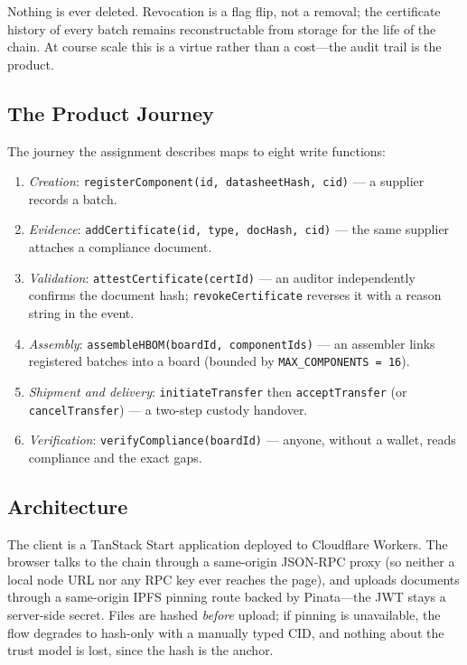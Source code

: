 \documentclass[conference]{IEEEtran}
\begin{document}
Nothing is ever deleted. Revocation is a flag flip, not a removal; the certificate history of every batch remains reconstructable from storage for the life of the chain. At course scale this is a virtue rather than a cost---the audit trail is the product.

\subsection{The Product Journey}
The journey the assignment describes maps to eight write functions:

\begin{enumerate}
\item \emph{Creation}: \texttt{registerComponent(id, datasheetHash, cid)} --- a supplier records a batch.
\item \emph{Evidence}: \texttt{addCertificate(id, type, docHash, cid)} --- the same supplier attaches a compliance document.
\item \emph{Validation}: \texttt{attestCertificate(certId)} --- an auditor independently confirms the document hash; \texttt{revokeCertificate} reverses it with a reason string in the event.
\item \emph{Assembly}: \texttt{assembleHBOM(boardId, componentIds)} --- an assembler links registered batches into a board (bounded by \texttt{MAX\_COMPONENTS = 16}).
\item \emph{Shipment and delivery}: \texttt{initiateTransfer} then \texttt{acceptTransfer} (or \texttt{cancelTransfer}) --- a two-step custody handover.
\item \emph{Verification}: \texttt{verifyCompliance(boardId)} --- anyone, without a wallet, reads compliance and the exact gaps.
\end{enumerate}

\subsection{Architecture}
The client is a TanStack Start application deployed to Cloudflare Workers. The browser talks to the chain through a same-origin JSON-RPC proxy (so neither a local node URL nor any RPC key ever reaches the page), and uploads documents through a same-origin IPFS pinning route backed by Pinata---the JWT stays a server-side secret. Files are hashed \emph{before} upload; if pinning is unavailable, the flow degrades to hash-only with a manually typed CID, and nothing about the trust model is lost, since the hash is the anchor.
\end{document}
